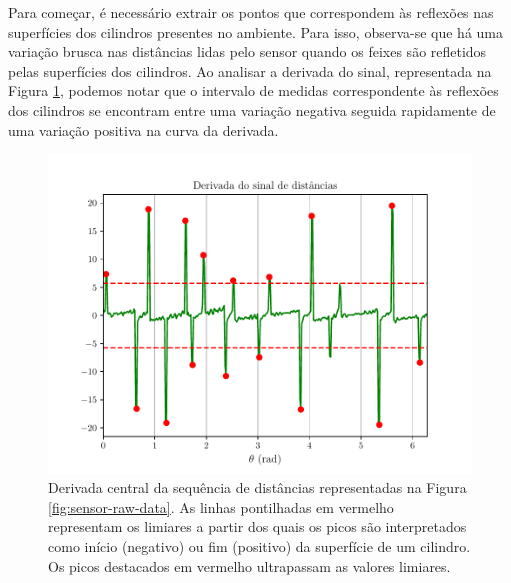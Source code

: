 Para começar, é necessário extrair os pontos que correspondem às reflexões nas 
superfícies dos cilindros presentes no ambiente. Para isso, observa-se que há uma variação brusca nas distâncias lidas pelo sensor quando os feixes são 
refletidos pelas superfícies dos cilindros. Ao analisar a derivada do sinal, 
representada na Figura \ref{fig:sensor-derivative}, podemos notar que o intervalo de medidas 
correspondente às reflexões dos cilindros se encontram entre uma variação 
negativa seguida rapidamente de uma variação positiva na curva da derivada.
\begin{figure}[]
  \centering
  \includegraphics[width=.6\textwidth]{figs/signal_derivative.pdf}
  \caption[Deriva do sinal de uma sequência de distâncias lida pelo sensor LiDAR]{Derivada central da sequência de distâncias representadas na Figura \ref{fig:sensor-raw-data}. As linhas pontilhadas em vermelho 
  representam os limiares a partir dos quais os picos são interpretados 
  como início (negativo) ou fim (positivo) da superfície de um cilindro. Os picos destacados 
  em vermelho ultrapassam as valores limiares.}
  \label{fig:sensor-derivative}
\end{figure}

